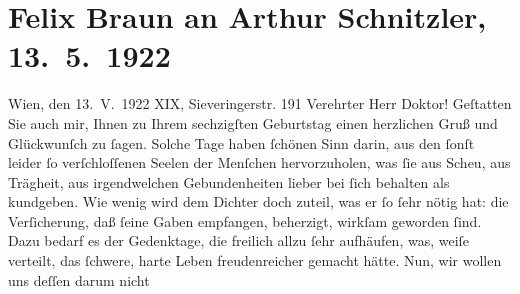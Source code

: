 

         
         \renewcommand{\erwaehntePersonen}{Personen: Felix Braun}
         \renewcommand{\erwaehnteOrte}{Orte: Sieveringer Straße, Wien}
         \renewcommand{\erwaehnteWerke}{}
               \section[Felix Braun an Arthur Schnitzler, 13. 5. 1922]{ Felix Braun an Arthur Schnitzler, 13. 5. 1922}\nopagebreak{}\rehead{ }\begin{ledgroupsized}[t]{13cm}\normalsize\beginnumbering \toendnotes[C]{\smallbreak\pagebreak[2]} 
\toendnotes[C]{\smallbreak}\pstart
           \raggedleft{}{\pb}Wien, den 13. V. 1922\pend
           \pstart
           \raggedleft{}XIX, Sieveringerstr. 191\pend
           \pstart{}Verehrter Herr Doktor!\pend\pstart
           Geſtatten Sie auch mir, Ihnen zu Ihrem sechzigſten Geburtstag einen herzlichen Gruß
               und Glückwunſch zu ſagen. Solche Tage haben \label{T_L02381-1v}\label{T_L02381-1h} ſchönen Sinn darin, aus den ſonſt
               leider ſo verſchloſſenen Seelen der Menſchen hervorzuholen, was ſie aus Scheu, aus
               Trägheit, aus irgendwelchen Gebundenheiten lieber bei ſich behalten als kundgeben.
               Wie wenig wird dem Dichter doch zuteil, was er ſo ſehr nötig hat: die Verſicherung,
               daß ſeine Gaben empfangen, beherzigt, wirkſam geworden ſind. Dazu bedarf es der
               Gedenktage, die freilich allzu ſehr aufhäufen, was, weiſe verteilt, das ſchwere,
               harte Leben freudenreicher gemacht hätte. Nun, wir wollen uns deſſen darum nicht

\end{ledgroupsized}
